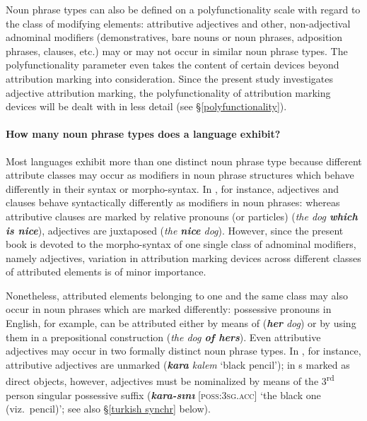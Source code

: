 Noun phrase types can also be defined on a polyfunctionality scale with regard to the class of modifying elements: attributive adjectives and other, non-adjectival adnominal modifiers (demonstratives, bare nouns or noun phrases, adposition phrases, clauses, etc.) may or may not occur in similar noun phrase types. The polyfunctionality parameter even takes the content of certain devices beyond attribution marking into consideration. Since the present study investigates adjective attribution marking, the polyfunctionality of attribution marking devices will be dealt with in less detail (see \S\ref{polyfunctionality}). 

\paragraph*{How many noun phrase types does a language exhibit?} 
Most languages exhibit more than one distinct noun phrase type because different attribute classes may occur as modifiers in noun phrase structures which behave differently in their syntax or morpho-syntax. In , for instance, adjectives and clauses behave syntactically differently as modifiers in noun phrases: whereas attributive clauses are marked by relative pronouns (or particles) (\textit{the dog \textbf{which is nice}}), adjectives are juxtaposed (\textit{the \textbf{nice} dog}). However, since the present book is devoted to the morpho-syntax of one single class of adnominal modifiers, namely adjectives, variation in attribution marking devices across different classes of attributed elements is of minor importance. 

Nonetheless, attributed elements belonging to one and the same class may also occur in noun phrases which are marked differently: possessive pronouns in English, for example, can be attributed either by means of  (\textit{\textbf{her} dog}) or by using them in a prepositional construction (\textit{the dog \textbf{of hers}}). Even attributive adjectives may occur in two formally distinct noun phrase types. In , for instance, attributive adjectives are unmarked (\textit{\textbf{kara} kalem} ‘black pencil’); in s marked as direct objects, however, adjectives must be nominalized by means of the 3\textsuperscript{rd} person singular possessive suffix (\textit{\textbf{kara-sını}} [\textsc{poss:3sg.acc}] ‘the black one (viz.~pencil)’; see also \S\ref{turkish synchr} below). 

